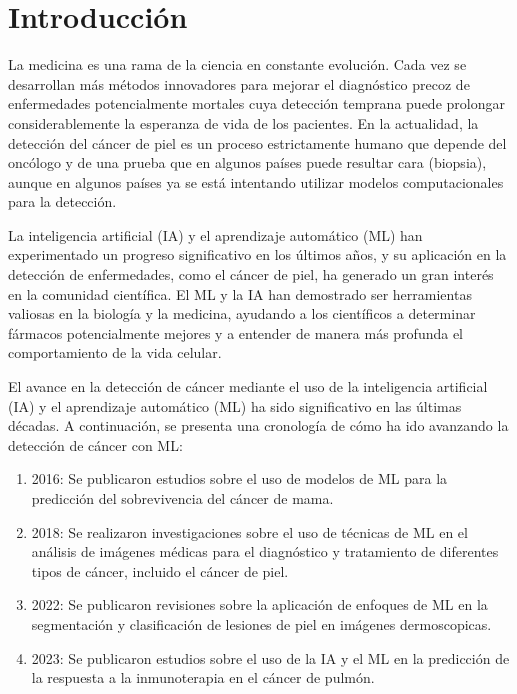 \chapter*{Introducción}\label{chapter:introduction}

La medicina es una rama de la ciencia en constante evolución. Cada vez se desarrollan más métodos innovadores para mejorar el diagnóstico precoz 
de enfermedades potencialmente mortales cuya detección temprana puede prolongar considerablemente la esperanza de vida de los pacientes. En la actualidad, 
la detección del cáncer de piel es un proceso estrictamente humano que depende del oncólogo y de una prueba que en algunos países puede resultar cara 
(biopsia), aunque en algunos países ya se está intentando utilizar modelos computacionales para la detección.

La inteligencia artificial (IA) y el aprendizaje automático (ML) han experimentado un progreso significativo en los últimos años, y su aplicación 
en la detección de enfermedades, como el cáncer de piel, ha generado un gran interés en la comunidad científica. El ML y la IA han demostrado ser 
herramientas valiosas en la biología y la medicina, ayudando a los científicos a determinar fármacos potencialmente mejores y a entender de manera 
más profunda el comportamiento de la vida celular.

El avance en la detección de cáncer mediante el uso de la inteligencia artificial (IA) y el aprendizaje automático (ML) ha sido significativo en 
las últimas décadas. A continuación, se presenta una cronología de cómo ha ido avanzando la detección de cáncer con ML:

\begin{enumerate}
    \item 2016: Se publicaron estudios sobre el uso de modelos de ML para la predicción del sobrevivencia del cáncer de mama. \cite{ml-breast-cancer}
    \item 2018: Se realizaron investigaciones sobre el uso de técnicas de ML en el análisis de imágenes médicas para el diagnóstico y tratamiento de 
    diferentes tipos de cáncer, incluido el cáncer de piel. \cite{ml-cancer-pred-diag}
    \item 2022: Se publicaron revisiones sobre la aplicación de enfoques de ML en la segmentación y clasificación de lesiones de piel en imágenes 
    dermoscopicas. \cite{ml-techniques-review}
    \item 2023: Se publicaron estudios sobre el uso de la IA y el ML en la predicción de la respuesta a la inmunoterapia en el cáncer de pulmón.\cite{ai-lung-cancer}
\end{enumerate}

